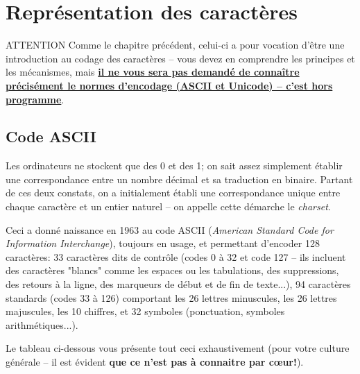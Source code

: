 \documentclass[12pt]{article}
\begin{document}
	\pagebreak
	
	\section{Représentation des caractères}
	
	\begin{MonAmp}{ATTENTION}
		Comme le chapitre précédent, celui-ci a pour vocation d'être une introduction au codage des caractères -- vous devez en comprendre les principes et les mécanismes, mais \textbf{\uline{il ne vous sera pas demandé de connaître précisément le normes d'encodage (ASCII et Unicode) -- c'est hors programme}}. 	\end{MonAmp}
	
	\subsection{Code ASCII}
	
	Les ordinateurs ne stockent que des 0 et des 1; on sait assez simplement établir une correspondance entre un nombre décimal et sa traduction en binaire. Partant de ces deux constats, on a initialement établi une correspondance unique entre chaque caractère et un entier naturel -- on appelle cette démarche le \textit{charset}.
	
	Ceci a donné naissance en 1963 au code ASCII (\textit{American Standard Code for Information Interchange}), toujours en usage, et permettant d'encoder 128 caractères: 33 caractères dits de contrôle (codes 0 à 32 et code 127 -- ils incluent des caractères "blancs" comme les espaces ou les tabulations, des suppressions, des retours à la ligne, des marqueurs de début et de fin de texte...), 94 caractères standards (codes 33 à 126) comportant les 26 lettres minuscules, les 26 lettres majuscules, les 10 chiffres, et 32 symboles (ponctuation, symboles arithmétiques...).
	
	Le tableau ci-dessous vous présente tout ceci exhaustivement (pour votre culture générale -- il est évident \textbf{que ce n'est pas à connaitre par cœur!}).
	
\end{document}
